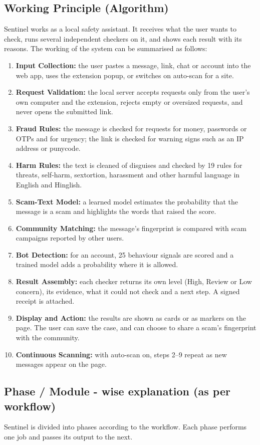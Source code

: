 \subsection{Working Principle (Algorithm)}
\noindent Sentinel works as a local safety assistant. It receives what the user wants to check, runs several independent checkers on it, and shows each result with its reasons. The working of the system can be summarised as follows:
\begin{enumerate}
\item \textbf{Input Collection:} the user pastes a message, link, chat or account into the web app, uses the extension popup, or switches on auto-scan for a site.
\item \textbf{Request Validation:} the local server accepts requests only from the user's own computer and the extension, rejects empty or oversized requests, and never opens the submitted link.
\item \textbf{Fraud Rules:} the message is checked for requests for money, passwords or OTPs and for urgency; the link is checked for warning signs such as an IP address or punycode.
\item \textbf{Harm Rules:} the text is cleaned of disguises and checked by 19 rules for threats, self-harm, sextortion, harassment and other harmful language in English and Hinglish.
\item \textbf{Scam-Text Model:} a learned model estimates the probability that the message is a scam and highlights the words that raised the score.
\item \textbf{Community Matching:} the message's fingerprint is compared with scam campaigns reported by other users.
\item \textbf{Bot Detection:} for an account, 25 behaviour signals are scored and a trained model adds a probability where it is allowed.
\item \textbf{Result Assembly:} each checker returns its own level (High, Review or Low concern), its evidence, what it could not check and a next step. A signed receipt is attached.
\item \textbf{Display and Action:} the results are shown as cards or as markers on the page. The user can save the case, and can choose to share a scam's fingerprint with the community.
\item \textbf{Continuous Scanning:} with auto-scan on, steps 2--9 repeat as new messages appear on the page.
\end{enumerate}

\subsection{Phase / Module - wise explanation (as per workflow)}
\noindent Sentinel is divided into phases according to the workflow. Each phase performs one job and passes its output to the next.

